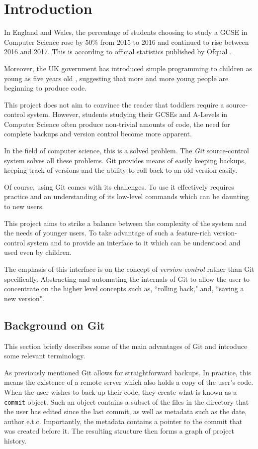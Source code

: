 \chapter{Introduction}

In England and Wales, the percentage of students choosing to study a GCSE in Computer Science rose by 50\% from 2015 to 2016 and continued to rise between 2016 and 2017. This is according to official statistics published by Ofqual  \cite{ofqual}.

Moreover, the UK government has introduced simple programming to children as young as five years old \cite{primarycoding}, suggesting that more and more young people are beginning to produce code.

This project does not aim to convince the reader that toddlers require a source-control system. However, students studying their GCSEs and A-Levels in Computer Science often produce non-trivial amounts of code, the need for complete backups and version control become more apparent.

In the field of computer science, this is a solved problem. The \emph{Git} \cite{git} source-control system solves all these problems. Git provides means of easily keeping backups, keeping track of versions and the ability to roll back to an old version easily.

Of course, using Git comes with its challenges. To use it effectively requires practice and an understanding of its low-level commands which can be daunting to new users.

This project aims to strike a balance between the complexity of the system and the needs of younger users. To take advantage of such a feature-rich version-control system and to provide an interface to it which can be understood and used even by children.

The emphasis of this interface is on the concept of \emph{version-control} rather than Git specifically. Abstracting and automating the internals of Git to allow the user to concentrate on the higher level concepts such as, ``rolling back," and, ``saving a new version".

\section{Background on Git}

This section briefly describes some of the main advantages of Git and introduce some relevant terminology. 

As previously mentioned Git allows for straightforward backups. In practice, this means the existence of a remote server which also holds a copy of the user's code. When the user wishes to back up their code, they create what is known as a \texttt{commit} object. Such an object contains a subset of the files in the directory that the user has edited since the last commit, as well as metadata such as the date, author e.t.c. Importantly, the metadata contains a pointer to the commit that was created before it. The resulting structure then forms a graph of project history.

